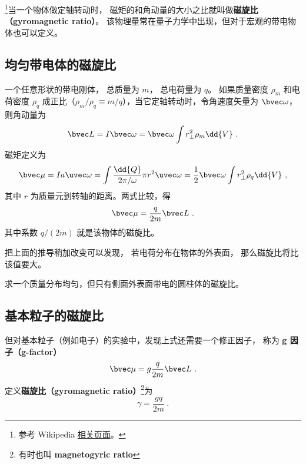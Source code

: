 


\footnote{参考 Wikipedia \href{https://en.wikipedia.org/wiki/Gyromagnetic_ratio}{相关页面}。}当一个物体做定轴转动时， 磁矩的和角动量的大小之比就叫做\textbf{磁旋比（gyromagnetic ratio）}。 该物理量常在量子力学中出现，但对于宏观的带电物体也可以定义。

\subsection{均匀带电体的磁旋比}
一个任意形状的带电刚体， 总质量为 $m$， 总电荷量为 $q$。 如果质量密度 $\rho_m$ 和电荷密度 $\rho_q$ 成正比（$\rho_m/\rho_q \equiv m/q$），当它定轴转动时，令角速度矢量为 $\bvec\omega$， 则角动量为
\begin{equation}
\bvec L = I\bvec \omega  = \bvec \omega \int r_\bot^2 \rho_m \dd{V}~.
\end{equation}
磁矩定义为
\begin{equation}
\bvec \mu  = Ia \uvec\omega = \int \frac{\dd{Q}}{2\pi/\omega}  \pi r^2 \uvec \omega
= \frac12 \bvec \omega \int r_\bot^2\rho_q \dd{V} ~,
\end{equation}
其中 $r$ 为质量元到转轴的距离。两式比较，得
\begin{equation}
\bvec \mu  = \frac{q}{2m} \bvec L~.
\end{equation}
其中系数 $q/(2m)$ 就是该物体的磁旋比。

把上面的推导稍加改变可以发现， 若电荷分布在物体的外表面， 那么磁旋比将比该值要大。
\begin{exercise}{}
求一个质量分布均匀，但只有侧面外表面带电的圆柱体的磁旋比。
\end{exercise}

\subsection{基本粒子的磁旋比}
但对基本粒子（例如电子）的实验中，发现上式还需要一个修正因子， 称为 \textbf{g 因子（g-factor）}
\begin{equation}
\bvec \mu  = g\frac{q}{2m}\bvec L~.
\end{equation}
定义\textbf{磁旋比（gyromagnetic ratio）}\footnote{有时也叫 \textbf{magnetogyric ratio}}为
\begin{equation}
\gamma  = \frac{gq}{2m}~.
\end{equation}


